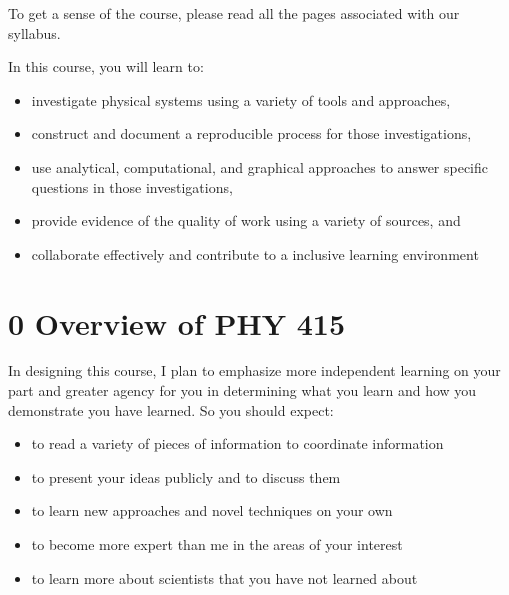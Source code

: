 \documentclass[letterpaper,10pt,english]{jupyterBook}
\begin{document}
\sphinxAtStartPar
To get a sense of the course, please read all the pages associated with our syllabus.

\begin{DUlineblock}{0em}
\item[] 
\end{DUlineblock}

\sphinxAtStartPar
In this course, you will learn to:
\begin{itemize}
\item {} 
\sphinxAtStartPar
investigate physical systems using a variety of tools and approaches,

\item {} 
\sphinxAtStartPar
construct and document a reproducible process for those investigations,

\item {} 
\sphinxAtStartPar
use analytical, computational, and graphical approaches to answer specific questions in those investigations,

\item {} 
\sphinxAtStartPar
provide evidence of the quality of work using a variety of sources, and

\item {} 
\sphinxAtStartPar
collaborate effectively and contribute to a inclusive learning environment

\end{itemize}

\sphinxstepscope


\chapter{0 \sphinxhyphen{} Overview of PHY 415}
\label{\detokenize{content/0_course/syllabus:overview-of-phy-415}}\label{\detokenize{content/0_course/syllabus::doc}}
\sphinxAtStartPar
In designing this course, I plan to emphasize more independent learning on your part and greater agency for you in determining what you learn and how you demonstrate you have learned. So you should expect:
\begin{itemize}
\item {} 
\sphinxAtStartPar
to read a variety of pieces of information to coordinate information

\item {} 
\sphinxAtStartPar
to present your ideas publicly and to discuss them

\item {} 
\sphinxAtStartPar
to learn new approaches and novel techniques on your own

\item {} 
\sphinxAtStartPar
to become more expert than me in the areas of your interest

\item {} 
\sphinxAtStartPar
to learn more about scientists that you have not learned about

\end{itemize}
\end{document}
